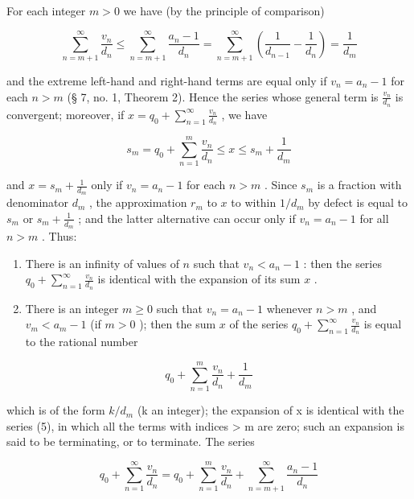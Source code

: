 For each integer \(m > 0\) we have (by the principle of comparison)

\[
\sum_ {n = m + 1} ^ {\infty} \frac {v _ {n}}{d _ {n}} \leqslant \sum_ {n = m + 1} ^ {\infty} \frac {a _ {n} - 1}{d _ {n}} = \sum_ {n = m + 1} ^ {\infty} \left(\frac {1}{d _ {n - 1}} - \frac {1}{d _ {n}}\right) = \frac {1}{d _ {m}}
\]

and the extreme left-hand and right-hand terms are equal only if \(v_{n} = a_{n} - 1\) for each \(n > m\) (§ 7, no. 1, Theorem 2). Hence the series whose general term is \(\frac{v_n}{d_n}\) is convergent; moreover, if \(x = q_0 + \sum_{n=1}^{\infty} \frac{v_n}{d_n}\) , we have

\[
s _ {m} = q _ {0} + \sum_ {n = 1} ^ {m} \frac {v _ {n}}{d _ {n}} \leqslant x \leqslant s _ {m} + \frac {1}{d _ {m}}
\]

and \(x = s_m + \frac{1}{d_m}\) only if \(v_n = a_n - 1\) for each \(n > m\) . Since \(s_m\) is a fraction with denominator \(d_m\) , the approximation \(r_m\) to \(x\) to within \(1/d_m\) by defect is equal to \(s_m\) or \(s_m + \frac{1}{d_m}\) ; and the latter alternative can occur only if \(v_{n} = a_{n} - 1\) for all \(n > m\) . Thus:

\begin{enumerate}
\def\labelenumi{(\roman{enumi})}
\item
  There is an infinity of values of \(n\) such that \(v_{n} < a_{n} - 1\) : then the series \(q_{0} + \sum_{n=1}^{\infty} \frac{v_{n}}{d_{n}}\) is identical with the expansion of its sum \(x\) .
\item
  There is an integer \(m \geqslant 0\) such that \(v_{n} = a_{n} - 1\) whenever \(n > m\) , and \(v_{m} < a_{m} - 1\) (if \(m > 0\) ); then the sum \(x\) of the series \(q_{0} + \sum_{n=1}^{\infty} \frac{v_{n}}{d_{n}}\) is equal to the rational number
\end{enumerate}

\[
q _ {0} + \sum_ {n = 1} ^ {m} \frac {v _ {n}}{d _ {n}} + \frac {1}{d _ {m}}\tag{5}
\]

which is of the form \(k/d_{m}\) (k an integer); the expansion of x is identical with the series (5), in which all the terms with indices \textgreater{} m are zero; such an expansion is said to be terminating, or to terminate. The series

\[
q _ {0} + \sum_ {n = 1} ^ {\infty} \frac {v _ {n}}{d _ {n}} = q _ {0} + \sum_ {n = 1} ^ {m} \frac {v _ {n}}{d _ {n}} + \sum_ {n = m + 1} ^ {\infty} \frac {a _ {n} - 1}{d _ {n}}\tag{6}
\]

